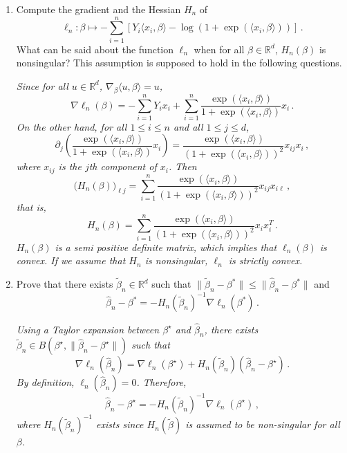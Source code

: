 \documentclass[a4paper,10pt,fleqn]{article}
\newcommand{\eqsp}{\,}
\newcommand{\rset}{\ensuremath{\mathbb{R}}}
\newcommand{\1}{\ensuremath{\mathbbm{1}}}
\begin{document}
\begin{enumerate}
\item Compute the gradient and the Hessian $H_{n}$ of
$$
\ell_{n}:\beta \mapsto -\sum_{i=1}^n\left[Y_{i}\langle x_{i},\beta\rangle-\log(1+\exp(\langle x_{i},\beta\rangle))\right]\eqsp.
$$
What can be said about the function $\ell_{n}$ when for all $\beta\in\rset^d$, $H_{n}(\beta)$ is nonsingular? This assumption is supposed to hold in the following questions.

\vspace{.2cm}

{\em
Since for all $u\in\rset^d$, $\nabla_{\beta} \langle u, \beta \rangle = u$, 
$$
\nabla \ell_n(\beta) = - \sum_{i=1}^n Y_i x_i + \sum_{i=1}^n \frac{\exp(\langle x_{i},\beta\rangle)}{1  + \exp(\langle x_{i},\beta\rangle)} x_i\eqsp.
$$
On the other hand, for all $1\leqslant i \leqslant n$ and all $1 \leqslant j \leqslant d$,
$$
\partial_j \left( \frac{\exp(\langle x_{i},\beta\rangle)}{1  + \exp(\langle x_{i},\beta\rangle)} x_i \right) = \frac{\exp(\langle x_{i},\beta\rangle)}{(1  + \exp(\langle x_{i},\beta\rangle))^2} x_{ij}x_i\eqsp,
$$
where $x_{ij}$ is the $j$th component of $x_i$. Then
$$
\big(H_n(\beta)\big)_{\ell j} = \sum_{i=1}^n \frac{\exp(\langle x_{i},\beta\rangle)}{(1  + \exp(\langle x_{i},\beta\rangle))^2} x_{ij}x_{i \ell}\eqsp,
$$
that is,
$$
H_n(\beta) = \sum_{i=1}^n \frac{\exp(\langle x_{i},\beta\rangle)}{(1  + \exp(\langle x_{i},\beta\rangle))^2} x_{i} x^T_{i}\eqsp.
$$
$H_n(\beta)$ is a semi positive definite matrix, which implies that $\ell_n(\beta)$ is convex. If we assume that $H_n$ is nonsingular, $\ell_n$  is strictly convex.
}
\item Prove that there exists $\widetilde \beta_n\in\rset^d$ such that $\|\widetilde \beta_n-\beta^*\|\leq \|\widehat \beta_n-\beta^*\|$ and
$$
\widehat \beta_n-\beta^*=-H_{n}(\widetilde \beta_n)^{-1}\nabla \ell_{n}(\beta^*)\eqsp.
$$

\vspace{.2cm}

{\em
Using a Taylor expansion between $\beta^{\star}$ and $\widehat{\beta}_n$, there exists $\tilde{\beta}_n \in B(\beta^{\star}, \|\widehat{\beta}_n - \beta^{\star}\|)$ such that 
$$
\nabla \ell_n(\widehat{\beta}_n) = \nabla \ell_n(\beta^{\star}) + H_n(\tilde{\beta}_n) ( \hat{\beta}_n - \beta^{\star})\eqsp. 
$$
By definition, $\ell_n(\widehat{\beta}_n) = 0$. Therefore, 
$$
\widehat{\beta}_n - \beta^{\star} = - H_n(\tilde{\beta}_n)^{-1} \nabla \ell_n(\beta^{\star})\eqsp,
$$
where $H_n(\tilde{\beta}_n)^{-1}$ exists since $H_n(\tilde{\beta})$ is assumed to be non-singular for all $\beta$.
}
\end{enumerate}
\end{document}
